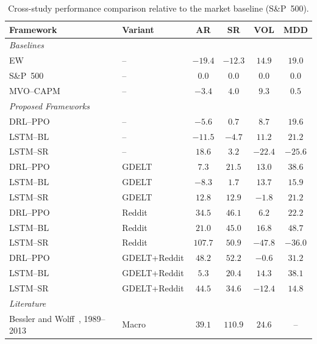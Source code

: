 \begin{table}[ht]
\centering
\caption{Cross-study performance comparison relative to the market baseline (S\&P~500).}
\label{tab:portfolio_optimization_results}
\renewcommand{\arraystretch}{1.2}
\begin{tabular}{|l | l | c | c | c | c|}
\hline
\textbf{Framework} & \textbf{Variant} & \textbf{AR} & \textbf{SR} & \textbf{VOL} & \textbf{MDD} \\
\hline\hline
\multicolumn{6}{|l|}{\textit{Baselines}} \\
\hline
EW               & --          & $-19.4$ & $-12.3$ & $14.9$ & $19.0$ \\
S\&P~500       & --          & $0.0$   & $0.0$   & $0.0$  & $0.0$  \\
MVO--CAPM        & --          & $-3.4$  & $4.0$   & $9.3$  & $0.5$  \\
\hline\hline
\multicolumn{6}{|l|}{\textit{Proposed Frameworks}} \\
\hline
DRL--PPO     & --              & $-5.6$  & $0.7$   & $8.7$  & $19.6$ \\
LSTM--BL     & --              & $-11.5$ & $-4.7$  & $11.2$ & $21.2$ \\
LSTM--SR     & --              & $18.6$  & $3.2$   & $-22.4$& $-25.6$\\
DRL--PPO     & GDELT           & $7.3$   & $21.5$  & $13.0$ & $38.6$ \\
LSTM--BL     & GDELT           & $-8.3$  & $1.7$   & $13.7$ & $15.9$ \\
LSTM--SR     & GDELT           & $12.8$  & $12.9$  & $-1.8$ & $21.2$ \\
DRL--PPO     & Reddit          & $34.5$  & $46.1$  & $6.2$  & $22.2$ \\
LSTM--BL     & Reddit          & $21.0$  & $45.0$  & $16.8$ & $48.7$ \\
LSTM--SR     & Reddit          & $107.7$ & $50.9$  & $-47.8$& $-36.0$\\
DRL--PPO     & GDELT+Reddit    & $48.2$  & $52.2$  & $-0.6$ & $31.2$ \\
LSTM--BL     & GDELT+Reddit    & $5.3$   & $20.4$  & $14.3$ & $38.1$ \\
LSTM--SR     & GDELT+Reddit    & $44.5$  & $34.6$  & $-12.4$& $14.8$ \\
\hline\hline
\multicolumn{6}{|l|}{\textit{Literature}} \\
\hline
Bessler and Wolff~\cite{83780}, 1989--2013        & Macro    & $39.1$  & $110.9$ & $24.6$  & --      \\

\end{tabular}
\end{table}
